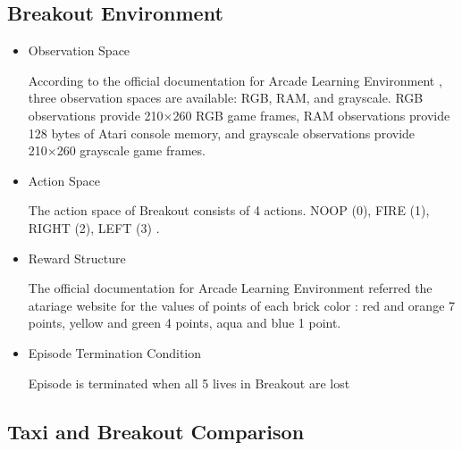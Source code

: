 \documentclass[11pt]{article}
\begin{document}
\subsection*{Breakout Environment}

\begin{itemize}
    \item Observation Space
    
    According to the official documentation for Arcade Learning Environment \cite{bellemare13arcade}, three observation spaces are available: RGB, RAM, and grayscale. RGB observations provide 210×260 RGB game frames, RAM observations provide 128 bytes of Atari console memory, and grayscale observations provide 210×260 grayscale game frames.

    \item Action Space
    
    The action space of Breakout consists of 4 actions. NOOP (0), FIRE (1), RIGHT (2), LEFT (3) \cite{bellemare13arcade}.

    \item Reward Structure

    The official documentation for Arcade Learning Environment referred the atariage website for the values of points of each brick color \cite{AtariAgeAtari2600}: red and orange 7 points, yellow and green 4 points, aqua and blue 1 point.

    \item Episode Termination Condition
    
    Episode is terminated when all 5 lives in Breakout are lost

\end{itemize}

\subsection*{Taxi and Breakout Comparison}
\end{document}
